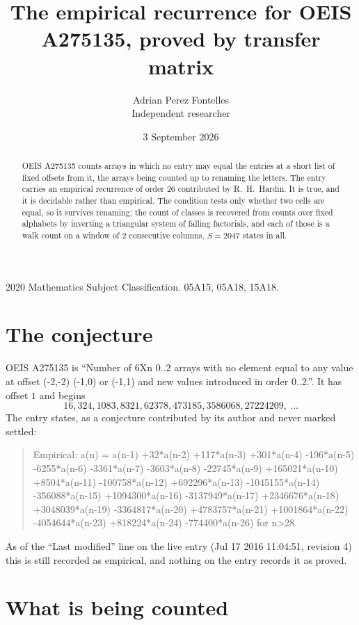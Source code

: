 \documentclass[11pt,a4paper]{article}
\title{The empirical recurrence for OEIS A275135, proved by transfer matrix}
\author{Adrian Perez Fontelles\\ \small Independent researcher}
\date{3 September 2026}
\theoremstyle{plain}
\theoremstyle{definition}
\begin{document}
\maketitle

\begin{abstract}
OEIS A275135 counts arrays in which no entry may equal the entries at a short list of fixed offsets
from it, the arrays being counted up to renaming the letters. The entry carries an empirical
recurrence of order $26$ contributed by R.~H.~Hardin. It is true, and it is decidable
rather than empirical. The condition tests only whether two cells are equal, so it survives
renaming; the count of classes is recovered from counts over fixed alphabets by inverting a
triangular system of falling factorials, and each of those is a walk count on a window of
$2$ consecutive columns, $S=2047$ states in all.
\end{abstract}

\noindent\small 2020 Mathematics Subject Classification. 05A15, 05A18, 15A18.\normalsize

\section{The conjecture}

OEIS A275135 is ``Number of 6Xn 0..2 arrays with no element equal to any value at offset (-2,-2) (-1,0) or (-1,1) and new values introduced in order 0..2.''. It has offset $1$ and begins
\[
16, 324, 1083, 8321, 62378, 473185, 3586068, 27224209,\ \dots
\]
The entry states, as a conjecture contributed by its author and never marked settled:
\begin{quote}
Empirical: a(n) = a(n-1) +32*a(n-2) +117*a(n-3) +301*a(n-4) -196*a(n-5) -6255*a(n-6) -3361*a(n-7) -3603*a(n-8) -22745*a(n-9) +165021*a(n-10) +8504*a(n-11) -100758*a(n-12) +692296*a(n-13) -1045155*a(n-14) -356088*a(n-15) +1094300*a(n-16) -3137949*a(n-17) +2346676*a(n-18) +3048039*a(n-19) -3364817*a(n-20) +4783757*a(n-21) +1001864*a(n-22) -4054644*a(n-23) +818224*a(n-24) -774400*a(n-26) for n>28
\end{quote}
As of the ``Last modified'' line on the live entry (Jul 17 2016 11:04:51, revision 4) this is still
recorded as empirical, and nothing on the entry records it as proved.

\section{What is being counted}
\end{document}
